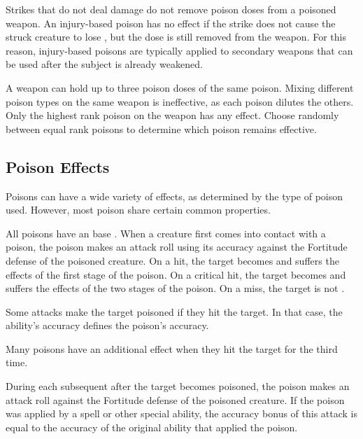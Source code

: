         Strikes that do not deal damage do not remove poison doses from a poisoned weapon.
        An injury-based poison has no effect if the strike does not cause the struck creature to lose , but the dose is still removed from the weapon.
        For this reason, injury-based poisons are typically applied to secondary weapons that can be used after the subject is already weakened.

        A weapon can hold up to three poison doses of the same poison.
        Mixing different poison types on the same weapon is ineffective, as each poison dilutes the others.
        Only the highest rank poison on the weapon has any effect.
        Choose randomly between equal rank poisons to determine which poison remains effective.

    \subsection{Poison Effects}\label{Poison Effects}

        Poisons can have a wide variety of effects, as determined by the type of poison used.
        However, most poison share certain common properties.

        All poisons have an base .
        When a creature first comes into contact with a poison, the poison makes an attack roll using its accuracy against the Fortitude defense of the poisoned creature.
        On a hit, the target becomes  and suffers the effects of the first stage of the poison.
        On a critical hit, the target becomes  and suffers the effects of the two stages of the poison.
        On a miss, the target is not .

        Some attacks make the target poisoned if they hit the target.
        In that case, the ability's accuracy defines the poison's accuracy.

        Many poisons have an additional effect when they hit the target for the third time.

        During each subsequent  after the target becomes poisoned, the poison makes an attack roll against the Fortitude defense of the poisoned creature.
        If the poison was applied by a spell or other special ability, the accuracy bonus of this attack is equal to the accuracy of the original ability that applied the poison.


